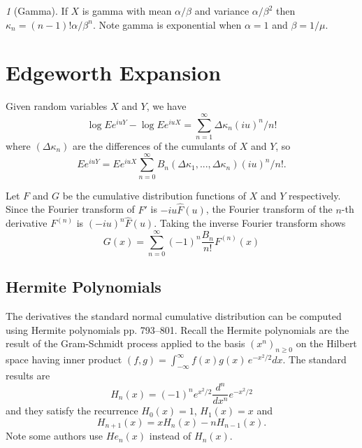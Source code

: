 \documentclass[11pt]{article}
\theoremstyle{remark}
\newtheorem*{example}{}
\begin{document}
\begin{example}[Gamma]
If \(X\) is gamma with mean \(\alpha/\beta\) and variance
\(\alpha/\beta^2\) then \(\kappa_n = (n - 1)!\alpha/\beta^n\).
Note gamma is exponential when
\(\alpha = 1\) and \(\beta = 1/\mu\).


\end{example}

\section{Edgeworth Expansion}
Given random
variables \(X\) and \(Y\), we have
\[\log E e^{iuY} - \log E e^{iuX} = \sum_{n=1}^\infty \Delta\kappa_n (iu)^n/n!\]
where \((\Delta\kappa_n)\) are the differences of the cumulants 
of \(X\) and \(Y\), so
\[
Ee^{iuY} = Ee^{iuX}\sum_{n=0}^\infty B_n(\Delta\kappa_1,...,\Delta\kappa_n)(iu)^n/n!.
\]

Let \(F\) and \(G\) be the cumulative distribution functions of
\(X\) and \(Y\) respectively.
Since the Fourier transform of \(F'\) is \(-iu \hat F(u)\),
the Fourier transform of the \(n\)-th derivative
\(F^{(n)}\) is \((-iu)^n\hat F(u)\).
Taking the inverse Fourier transform shows
\[
G(x) = \sum_{n=0}^\infty (-1)^n \frac{B_n}{n!} F^{(n)}(x)
\]

\subsection{Hermite Polynomials}
The derivatives the standard normal cumulative distribution 
can be computed using Hermite polynomials\cite{AbrSte1964}
pp. 793--801.
Recall the Hermite polynomials are the result of the Gram-Schmidt
process applied to the basis \((x^n)_{n\ge0}\) on the Hilbert space
having inner product \((f,g) = \int_{-\infty}^\infty f(x)g(x)\,e^{-x^2/2}dx\).
The standard results are
\[
H_n(x) = (-1)^n e^{x^2/2}\frac{d^n}{dx^n}e^{-x^2/2}
\]
and they satisfy the recurrence \(H_0(x) = 1\), \(H_1(x) = x\) and
\[
H_{n+1}(x) = xH_n(x) - n H_{n-1}(x).
\]
Note some authors use \(He_n(x)\) instead of \(H_n(x)\).
\end{document}
